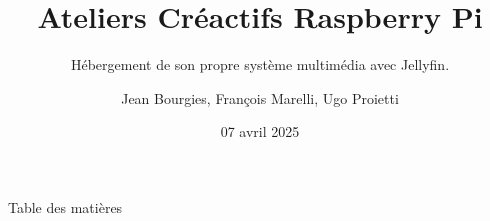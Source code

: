 \documentclass[aspectratio=169,xcolor=dvipsnames]{beamer}
\title{Ateliers Créactifs Raspberry Pi}
\subtitle{Hébergement de son propre système multimédia avec Jellyfin.}
\author{Jean Bourgies, François Marelli, Ugo Proietti}
\date{07 avril 2025}
\begin{document}
\begin{frame}
    \titlepage
\end{frame}

\begin{frame}{Table des matières}
    \tableofcontents
\end{frame}
\end{document}
